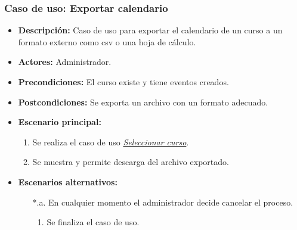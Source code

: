 \documentclass{book}
\begin{document}
\subsubsection*{Caso de uso: Exportar calendario}
\begin{itemize}
\item{\bf Descripción:} Caso de uso para exportar el calendario de un curso a un formato externo como csv o una hoja de cálculo.
\item{\bf Actores:} Administrador.
\item{\bf Precondiciones:} El curso existe y tiene eventos creados.
\item{\bf Postcondiciones:} Se exporta un archivo con un formato adecuado.
\item{\bf Escenario principal:}
	\begin{enumerate}
	\item Se realiza el caso de uso {\em \hyperref[select_curso]{Seleccionar curso}}.
	\item Se muestra y permite descarga del archivo exportado.
	\end{enumerate}
\item{\bf Escenarios alternativos:}
	\begin{itemize}
		\item[*.a.] En cualquier momento el administrador decide cancelar el proceso.
		\begin{enumerate}
			\item Se finaliza el caso de uso.
		\end{enumerate}
	\end{itemize}
\end{itemize}

\pagebreak
\end{document}
